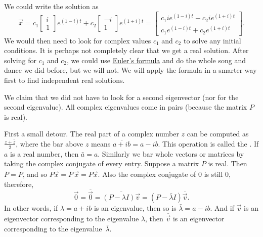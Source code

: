 We could write the solution as
\begin{equation*}
\vec{x} =
c_1 \begin{bmatrix} i \\ 1 \end{bmatrix} e^{(1-i)t} +
c_2 \begin{bmatrix} -i \\ 1 \end{bmatrix} e^{(1+i)t}
=
\begin{bmatrix}
c_1 i e^{(1-i)t} - c_2 i e^{(1+i)t} \\
c_1 e^{(1-i)t} + c_2 e^{(1+i)t}
\end{bmatrix} .
\end{equation*}
We would then need to look for complex values $c_1$ and $c_2$ to solve
any initial conditions.  It is perhaps not completely clear
that we get a real solution.  After solving for $c_1$ and $c_2$,
we could use
\hyperref[eulersformula]{Euler's formula} and do the
whole song and dance we did before, but we will not.   We will apply
the formula in a smarter way first to find independent real solutions.

\medskip

We claim that we did not have to look for a second eigenvector
(nor for the second eigenvalue).  All complex eigenvalues come in pairs
(because the matrix $P$ is real).

First a small detour.  The real part of
a complex number $z$ can be computed as $\frac{z + \bar{z}}{2}$, where
the bar above $z$ means $\overline{a+ib} = a -ib$.  This operation is called the
\emph{}.
If $a$ is a real number, then $\bar{a} = a$.
Similarly
we bar whole vectors or matrices by taking the complex conjugate
of every entry.  Suppose a matrix $P$ is real.  Then
$\overline{P} = P$, and so $\overline{P\vec{x}} = \overline{P} \,
\overline{\vec{x}} = P \overline{\vec{x}}$.
Also the complex conjugate of 0 is still 0,
therefore,
\begin{equation*}
\vec{0} = \overline{\vec{0}} = 
\overline{(P-\lambda I)\vec{v}}
=
(P-\bar{\lambda} I)\overline{\vec{v}} .
\end{equation*}
In other words, if $\lambda = a+ib$ is an eigenvalue, then so is $\bar{\lambda} = a-ib$.
And if $\vec{v}$ is an eigenvector corresponding to the eigenvalue
$\lambda$, then $\overline{\vec{v}}$ is an eigenvector corresponding
to the eigenvalue~$\bar{\lambda}$.  

